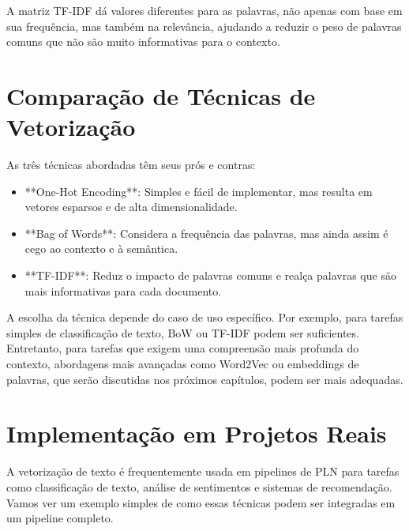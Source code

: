 \documentclass[14pt,a4paper,oneside]{book}
\begin{document}
A matriz TF-IDF dá valores diferentes para as palavras, não apenas com base em sua frequência, mas também na relevância, ajudando a reduzir o peso de palavras comuns que não são muito informativas para o contexto.

\section{Comparação de Técnicas de Vetorização}
As três técnicas abordadas têm seus prós e contras:

\begin{itemize}
	\item **One-Hot Encoding**: Simples e fácil de implementar, mas resulta em vetores esparsos e de alta dimensionalidade.
	\item **Bag of Words**: Considera a frequência das palavras, mas ainda assim é cego ao contexto e à semântica.
	\item **TF-IDF**: Reduz o impacto de palavras comuns e realça palavras que são mais informativas para cada documento.
\end{itemize}

A escolha da técnica depende do caso de uso específico. Por exemplo, para tarefas simples de classificação de texto, BoW ou TF-IDF podem ser suficientes. Entretanto, para tarefas que exigem uma compreensão mais profunda do contexto, abordagens mais avançadas como Word2Vec ou embeddings de palavras, que serão discutidas nos próximos capítulos, podem ser mais adequadas.

\section{Implementação em Projetos Reais}
A vetorização de texto é frequentemente usada em pipelines de PLN para tarefas como classificação de texto, análise de sentimentos e sistemas de recomendação. Vamos ver um exemplo simples de como essas técnicas podem ser integradas em um pipeline completo.
\end{document}
